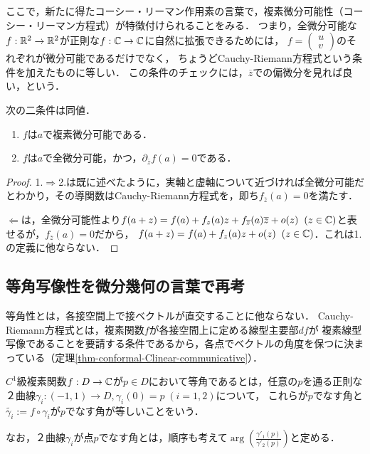 \documentclass[uplatex, dvipdfmx]{jsreport}
\begin{document}
ここで，新たに得たコーシー・リーマン作用素の言葉で，複素微分可能性（コーシー・リーマン方程式）が特徴付けられることをみる．
つまり，全微分可能な$f:\mathbb{R}^2\to\mathbb{R}^2$が正則な$f:\mathbb{C}\to\mathbb{C}$に自然に拡張できるためには，
$f=\begin{pmatrix}u\\v\end{pmatrix}$のそれぞれが微分可能であるだけでなく，
ちょうどCauchy-Riemann方程式という条件を加えたものに等しい．
この条件のチェックには，$\overline{z}$での偏微分を見れば良い，という．

\begin{theorem}[複素微分可能性の特徴付け]\label{thm-charactorization-of-complex-differentialability}
    次の二条件は同値．
    \begin{enumerate}
        \item $f$は$a$で複素微分可能である．
        \item $f$は$a$で全微分可能，かつ，$\partial_{\overline{z}}f(a)=0$である．
    \end{enumerate}
\end{theorem}
\begin{proof}
    1.$\Rightarrow$2.は既に述べたように，実軸と虚軸について近づければ全微分可能だとわかり，その導関数はCauchy-Riemann方程式を，即ち$f_{\overline{z}}(a)=0$を満たす．
    
    $\Leftarrow$は，全微分可能性より$f(a+z)=f(a)+f_z(a)z+f_{\overline{z}}(a)\overline{z}+o(z)\;\;(z\in\mathbb{C})$と表せるが，$f_{\overline{z}}(a)=0$だから，
    $f(a+z)=f(a)+f_z(a)z+o(z)\;\;(z\in\mathbb{C})$．これは1.の定義に他ならない．
\end{proof}

\subsection{等角写像性を微分幾何の言葉で再考}

\begin{screen}
    等角性とは，各接空間上で接ベクトルが直交することに他ならない．
    Cauchy-Riemann方程式とは，複素関数$f$が各接空間上に定める線型主要部$df$が
    複素線型写像であることを要請する条件であるから，各点でベクトルの角度を保つに決まっている（定理\ref{thm-conformal-Clinear-communicative}）．
\end{screen}

\begin{definition}[conformal]
    $C^1$級複素関数$f:D\to\mathbb{C}$が$p\in D$において等角であるとは，任意の$p$を通る正則な２曲線$\gamma_i:(-1,1)\to D, \gamma_i(0)=p\;(i=1,2)$について，
    これらが$p$でなす角と$\tilde{\gamma_i}:=f\circ\gamma_i$が$p$でなす角が等しいことをいう．
    
    なお，２曲線$\gamma_i$が点$p$でなす角とは，順序も考えて$\arg\left(\frac{\gamma'_1(p)}{\gamma'_2(p)}\right)$と定める．
\end{definition}
\end{document}
